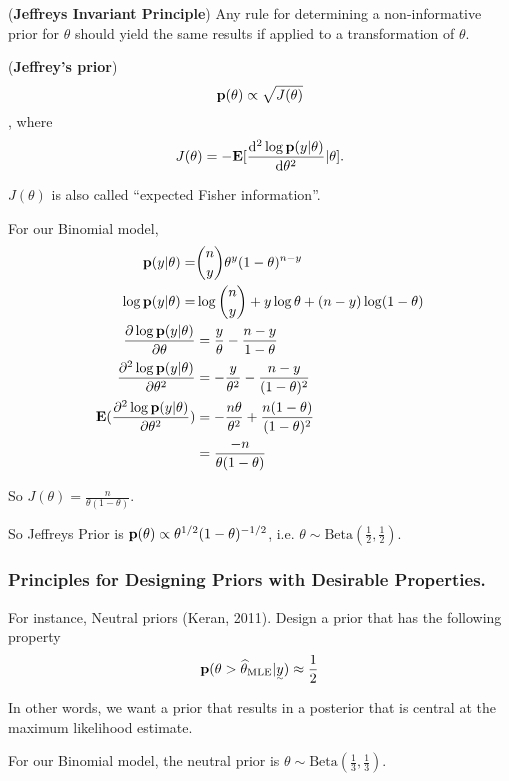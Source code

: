 \begin{theorem}
(\textbf{Jeffreys Invariant Principle}) Any rule for determining a non-informative prior for $\theta$ should yield the same results if applied to a transformation of $\theta$.
\end{theorem}

\begin{definition}
(\textbf{Jeffrey's prior})
\[
    {\mathbf p}(\theta) \propto \sqrt{J(\theta)}
\]
, where
\[
J(\theta) = - {\mathbf E}[\frac{\mathop{}\!\mathrm{d}^2 \log {\mathbf p}(y|\theta)}{\mathop{}\!\mathrm{d} \theta^2} | \theta].
\]

$J(\theta)$ is also called ``expected Fisher information''.
\end{definition}

For our Binomial model,
\begin{align*}
    {\mathbf p}(y|\theta) 
    =& \binom{n}{y} \theta^y (1-\theta)^{n-y}\\
    \log {\mathbf p}(y|\theta) 
    =& \log \binom{n}{y} + y \log \theta + (n-y) \log (1 - \theta)\\
    \pdv{\log {\mathbf p}(y|\theta)}{\theta} 
    &= \frac{y}{\theta} - \frac{n-y}{1 - \theta}\\
    \pdv[2]{\log {\mathbf p}(y|\theta)}{\theta} 
    &=  -\frac{y}{\theta^2} - \frac{n-y}{(1 - \theta)^2}\\
    {\mathbf E}(\pdv[2]{\log {\mathbf p}(y|\theta)}{\theta}) 
    &=  -\frac{n\theta}{\theta^2} + \frac{n(1-\theta)}{(1 - \theta)^2}\\
    &=  \frac{-n}{\theta(1-\theta)}
\end{align*}

So $J(\theta) = \frac{n}{\theta(1-\theta)}$. 

So Jeffreys Prior is ${\mathbf p}(\theta) \propto \theta^{1/2} (1-\theta)^{-1/2}$, i.e. $\theta \sim \text{Beta}(\frac{1}{2}, \frac{1}{2})$.

\subsubsection{Principles for Designing Priors with Desirable Properties.}

For instance, Neutral priors (Keran, 2011). Design a prior that has the following property
\[
\p(\theta > \hat \theta_\MLE | \vec{y}) \approx \frac{1}{2}
\]

In other words, we want a prior that results in a posterior that is central at the maximum likelihood estimate.

For our Binomial model, the neutral prior is $\theta \sim \text{Beta}(\frac{1}{3}, \frac{1}{3})$.